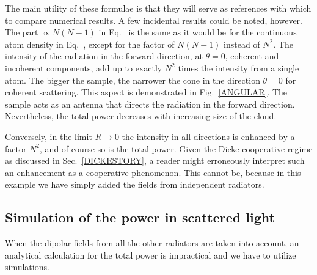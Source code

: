 The main utility of these formulae is that they will serve as references with which to compare numerical results. A few incidental results could be noted, however.  The part $\propto N(N-1)$ in Eq.~ is the same as it would be for the continuous atom density in Eq.~, except for the factor of $N(N-1)$ instead of $N^2$. The intensity of the radiation in the forward direction, at $\theta=0$, coherent and incoherent components, add up to exactly $N^2$ times the intensity from a single atom. The bigger the sample, the narrower the cone in the direction $\theta=0$ for coherent scattering.  This aspect is demonstrated in Fig.~\ref{ANGULAR}. The sample acts as an antenna that directs the radiation in the forward direction. Nevertheless, the total power decreases with increasing size of the cloud.

Conversely, in the limit $R\rightarrow0$ the intensity in all directions is enhanced by a factor $N^2$, and of course so is the total power. Given the Dicke cooperative regime as discussed in Sec.~\ref{DICKESTORY}, a reader might erroneously interpret such an enhancement as a cooperative phenomenon. This cannot be, because in this example we have simply added the fields from independent radiators.


\subsection{Simulation of the power in scattered light} 

When the dipolar fields from all the other radiators are taken into account, an analytical calculation for the total power is impractical and we have to utilize simulations. 

